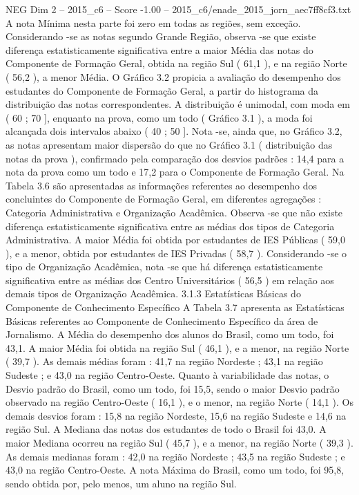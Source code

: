 \begin{textsample}{NEG Dim 2 – 2015\_c6 – Score -1.00 – 2015\_c6/enade\_2015\_jorn\_aec7ff8cf3.txt}
A nota Mínima nesta parte foi zero em todas as regiões, sem exceção.
Considerando -se as notas segundo Grande Região, observa -se que existe diferença estatisticamente significativa entre a maior Média das notas do Componente de Formação Geral, obtida na região Sul ( 61,1 ), e na região Norte ( 56,2 ), a menor Média.
O Gráfico 3.2 propicia a avaliação do desempenho dos estudantes do Componente de Formação Geral, a partir do histograma da distribuição das notas correspondentes.
A distribuição é unimodal, com moda em ( 60 ; 70 ], enquanto na prova, como um todo ( Gráfico 3.1 ), a moda foi alcançada dois intervalos abaixo ( 40 ; 50 ].
Nota -se, ainda que, no Gráfico 3.2, as notas apresentam maior dispersão do que no Gráfico 3.1 ( distribuição das notas da prova ), confirmado pela comparação dos desvios padrões : 14,4 para a nota da prova como um todo e 17,2 para o Componente de Formação Geral.
Na Tabela 3.6 são apresentadas as informações referentes ao desempenho dos concluintes do Componente de Formação Geral, em diferentes agregações : Categoria Administrativa e Organização Acadêmica.
Observa -se que não existe diferença estatisticamente significativa entre as médias dos tipos de Categoria Administrativa.
A maior Média foi obtida por estudantes de IES Públicas ( 59,0 ), e a menor, obtida por estudantes de IES Privadas ( 58,7 ).
Considerando -se o tipo de Organização Acadêmica, nota -se que há diferença estatisticamente significativa entre as médias dos Centro Universitários ( 56,5 ) em relação aos demais tipos de Organização Acadêmica. 3.1.3 Estatísticas Básicas do Componente de Conhecimento Específico A Tabela 3.7 apresenta as Estatísticas Básicas referentes ao Componente de Conhecimento Específico da área de Jornalismo.
A Média do desempenho dos alunos do Brasil, como um todo, foi 43,1.
A maior Média foi obtida na região Sul ( 46,1 ), e a menor, na região Norte ( 39,7 ).
As demais médias foram : 41,7 na região Nordeste ; 43,1 na região Sudeste ; e 43,0 na região Centro-Oeste.
Quanto à variabilidade das notas, o Desvio padrão do Brasil, como um todo, foi 15,5, sendo o maior Desvio padrão observado na região Centro-Oeste ( 16,1 ), e o menor, na região Norte ( 14,1 ).
Os demais desvios foram : 15,8 na região Nordeste, 15,6 na região Sudeste e 14,6 na região Sul.
A Mediana das notas dos estudantes de todo o Brasil foi 43,0.
A maior Mediana ocorreu na região Sul ( 45,7 ), e a menor, na região Norte ( 39,3 ).
As demais medianas foram : 42,0 na região Nordeste ; 43,5 na região Sudeste ; e 43,0 na região Centro-Oeste.
A nota Máxima do Brasil, como um todo, foi 95,8, sendo obtida por, pelo menos, um aluno na região Sul.

\end{textsample}
